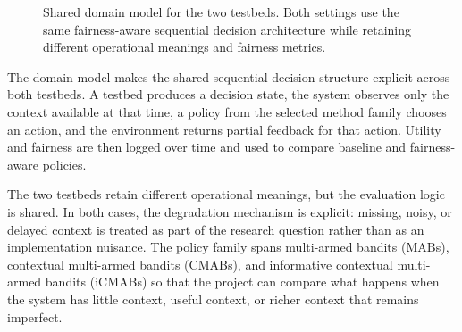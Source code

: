 \documentclass{IEEEtran}
\begin{document}
\begin{figure}[!t]
\centering
{}
\caption{Shared domain model for the two testbeds. Both settings use the same fairness-aware
sequential decision architecture while retaining different operational meanings and fairness
metrics.}
\label{fig:domain_model}
\end{figure}

The domain model makes the shared sequential decision structure explicit
across both testbeds. A testbed produces a decision state, the system
observes only the context available at that time, a policy from the selected
method family chooses an action, and the environment returns partial feedback
for that action. Utility and fairness are then logged over time and used to
compare baseline and fairness-aware policies.

The two testbeds retain different operational meanings, but the evaluation
logic is shared. In both cases, the degradation mechanism is explicit:
missing, noisy, or delayed context is treated as part of the research
question rather than as an implementation nuisance. The policy family spans
multi-armed bandits (MABs), contextual multi-armed bandits (CMABs), and
informative contextual multi-armed bandits (iCMABs) so that the project can
compare what happens when the system has little context, useful context, or
richer context that remains imperfect.
\end{document}
